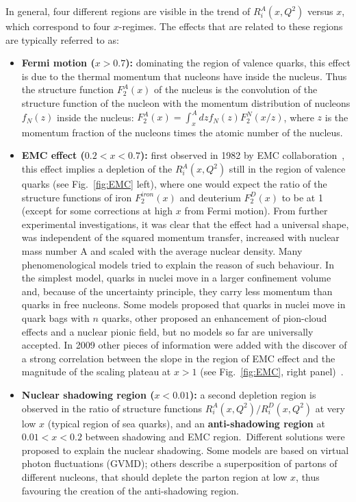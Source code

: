 In general, four different regions are visible in the trend of $R_i^A(x,Q^2)$ versus $x$,
which correspond to four $x$-regimes. The effects that are related to these regions are typically referred to as:
\begin{itemize}
\item {\bf Fermi motion ($x > 0.7$):} dominating the region of valence quarks, this effect is due to the 
thermal momentum that nucleons have inside the nucleus. Thus the structure function $F^A_2(x)$ of the nucleus
is the convolution of the structure function of the nucleon with the momentum distribution
of nucleons $f_N(z)$ inside the nucleus: $F^A_2(x) = \int_x^A dz f_N(z) F_2^N(x/z)$, where $z$ is the momentum fraction
of the nucleons times the atomic number of the nucleus.
\item {\bf EMC effect ($0.2 < x < 0.7$):} first observed in 1982 by EMC collaboration~\cite{Aubert:1983xm},
this effect implies a depletion of the  $R_i^A(x,Q^2)$ still in the region of valence quarks (see Fig.~\ref{fig:EMC} left), where one would expect 
the ratio of the structure functions of iron $F^{iron}_2(x)$ and deuterium $F^D_2(x)$ to be at 1 (except for 
some corrections at high $x$ from Fermi motion). From further
experimental investigations, it was clear that the effect had a universal shape, was independent of the 
squared momentum transfer, increased with nuclear mass number A and scaled with the average nuclear density. 
Many phenomenological models tried to explain the reason of such behaviour. In the simplest model, 
quarks in nuclei move in a larger confinement volume and, because of the uncertainty principle, 
they carry less momentum than quarks in free nucleons. Some models proposed that 
quarks in nuclei move in quark bags with $n$ quarks, other proposed an enhancement 
of pion-cloud effects and a nuclear pionic field, but no models so far are universally accepted. 
 In 2009 other pieces of information were added with the
discover of a strong correlation between the slope in the region of EMC effect and the magnitude of the scaling plateau 
at $x > 1$ (see Fig.~\ref{fig:EMC}, right panel)~\cite{Seely:2009gt}.
\item {\bf Nuclear shadowing region ($x < 0.01$):} a second depletion region
is observed in the ratio of structure functions $R_i^A(x,Q^2)/R_i^D(x,Q^2)$ at very low $x$ (typical region of sea quarks), and
an {\bf anti-shadowing region} at $0.01 < x < 0.2$ between shadowing and EMC region.~Different solutions were
proposed to explain the nuclear shadowing. Some models are based on virtual photon fluctuations (GVMD); others
describe a superposition of partons of different nucleons, that should deplete the parton region at low $x$, thus favouring
the creation of the anti-shadowing region.

\end{itemize}



